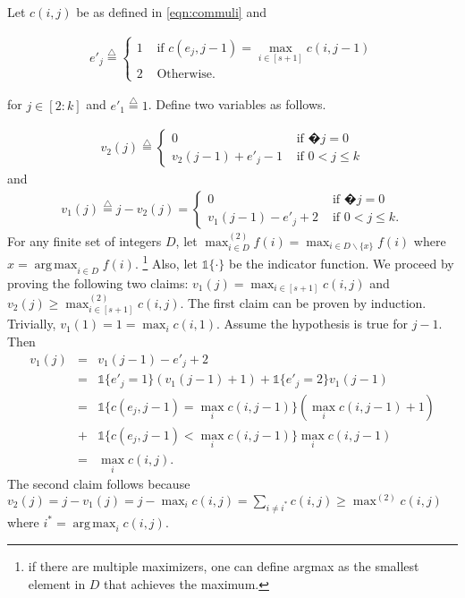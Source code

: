 \documentclass[journal,onecolumn,draftcls]{IEEEtran}
\DeclareMathOperator*{\argmax}{arg\,max}
\begin{document}
\begin{IEEEproof}

 Let $c(i,j)$ be as defined in \eqref{eqn:commuli} and 

\begin{eqnarray*}
e'_j \stackrel{\triangle}{=} \begin{cases}1 &\mbox{ if }  c(e_j,j-1)=\max_{i\in[s+1]} c(i,j-1) \\ 2 &\mbox{ Otherwise. }\end{cases}
\end{eqnarray*}


for $j \in [2:k]$ and $e'_1  \stackrel{\triangle}{=} 1$. Define two variables as follows.

\begin{eqnarray}
v_2(j) \stackrel{\triangle}{=} \begin{cases}0 & \mbox{ if }�j = 0\\ v_2(j-1)+ e'_j-1 &\mbox{ if } 0<j\le k\end{cases}
\label{eqn:cumulative2}
\end{eqnarray}
and 
\begin{eqnarray}
v_1(j) \stackrel{\triangle}{=} j - v_2(j) = \begin{cases}0 & \mbox{ if }�j = 0\\ v_1(j-1)- e'_j+2 &\mbox{ if } 0<j\le k.\end{cases}
\label{eqn:cumulative1}
\end{eqnarray}
For any finite set of integers $D$, let $\max^{(2)}_{i\in D} f(i) = \max_{i\in D\backslash\{x\}} f(i)$ where $x = \argmax_{i\in D}f(i)$. \footnote{if there are multiple maximizers, one can define argmax as the smallest element in $D$ that achieves the maximum.} Also, let $\mathds{1}\{\cdot\}$ be the indicator function. We proceed by proving the following two claims: $v_1(j)=  \max_{i\in[s+1]} c(i,j)$ and $v_2(j) \ge \max^{(2)}_{i\in[s+1]}c(i,j)$. The first claim can be proven by induction. Trivially, $v_1(1) = 1 = \max_i c(i,1) $. Assume the hypothesis is true for $j-1$. Then
\begin{eqnarray*}
v_1(j)&=& v_1(j-1) - e'_j+2 \\
&=&\mathds{1}\{e'_j =1\} (v_1(j-1) + 1) +  \mathds{1}\{e'_j =2\} v_1(j-1) \\
&=& \mathds{1}\{c(e_j,j-1)=\max_{i} c(i,j-1) \} (\max_i c(i,j-1) + 1)\\ &+&  \mathds{1}\{c(e_j,j-1)< \max_{i} c(i,j-1) \} \max_i c(i,j-1)\\
&=&\max_{i} c(i,j).
\end{eqnarray*}
The second claim follows because $v_2(j) = j - v_1(j)  = j - \max_{i} c(i,j) = \sum_{i\neq i^*} c(i,j) \ge \max^{(2)}c(i,j)$ where $i^* = \argmax_i c(i,j)$.


\end{IEEEproof}
\end{document}
